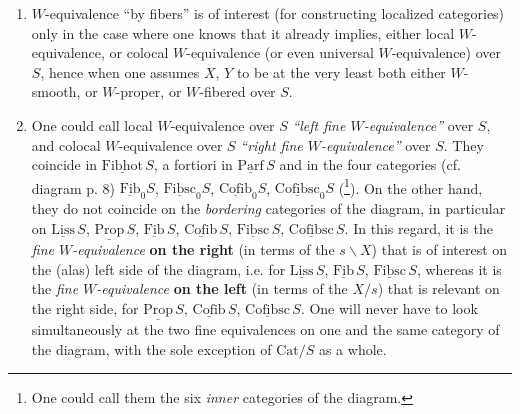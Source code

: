\documentclass[11pt]{article}
\newcommand{\msp}[1]{\marginpar{\footnotesize [#1]}}
\newcommand{\uc}[1]{\underline{\mathrm{#1}}}
\newcommand{\Cat}{\mathrm{Cat}}
\begin{document}
\begin{enumerate}[leftmargin=*]
\item[1)] $W$-equivalence ``by fibers'' is of interest (for constructing localized categories) only in the case where one knows that it already implies, either local $W$-equivalence, or colocal $W$-equivalence (or even universal $W$-equivalence) over $S$, hence when one assumes $X$, $Y$ to be at the very least both either $W$-smooth, or $W$-proper, or $W$-fibered over $S$.

\item[2)] One could call local $W$-equivalence over $S$ \textit{``left fine $W$-equivalence''} over $S$, and colocal $W$-equivalence over $S$ \textit{``right fine $W$-equivalence''} over $S$. They coincide in $\uc{Fibhot}\,S$, a fortiori in $\uc{Parf}\,S$ and in the four categories (cf. diagram p. 8) $\uc{Fib}_0S$, $\uc{Fibsc}_0S$, $\uc{Cofib}_0S$, $\uc{Cofibsc}_0S$ (\footnote[33]{One could call them the six \textit{inner} categories of the diagram.}). On the other hand, they do not coincide on the \textit{bordering} categories of the diagram, in particular on $\uc{Liss}\,S$, $\uc{Prop}\,S$, $\uc{Fib}\,S$, $\uc{Cofib}\,S$, $\uc{Fibsc}\,S$, $\uc{Cofibsc}\,S$. In this regard, it is the \textit{fine $W$-equivalence} \textbf{on the right} (in terms of the $s\backslash X$) that is of interest on the (alas) left side of the diagram, i.e. for $\uc{Liss}\,S$, $\uc{Fib}\,S$, $\uc{Fibsc}\,S$, whereas it is the \textit{fine $W$-equivalence} \textbf{on the left} (in terms of the $X/s$) that is relevant on the right side, for $\uc{Prop}\,S$, $\uc{Cofib}\,S$, $\uc{Cofibsc}\,S$. One will never have to look simultaneously at the two fine equivalences on one and the same category of the diagram, with the sole exception of $\Cat/S$ as a whole.
\end{enumerate}

\msp{page 47}
\end{document}
